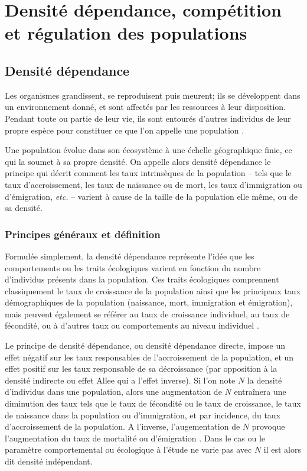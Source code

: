 \section{Densité dépendance,
compétition et régulation des populations}

\subsection{Densité dépendance}

Les organismes grandissent, se reproduisent puis meurent; ils se développent
dans un environnement donné, et sont affectés par les ressources à leur
disposition. Pendant toute ou partie de leur vie, ils sont
entourés d'autres individus de leur propre espèce pour constituer ce que l'on
appelle une population \autocites{begon2009a}. 

Une population évolue dans son écosystème à une échelle géographique finie, ce
qui la soumet à sa propre densité. On appelle alors densité
dépendance le principe qui décrit comment les taux intrinsèques de la
population -- tels que le taux d'accroissement, les taux de naissance ou de
mort, les taux d'immigration ou d'émigration, \textit{etc.} -- varient à cause
de la taille de la population elle même, ou de sa densité.

\subsubsection{Principes généraux et définition}

Formulée simplement, la densité dépendance représente l'idée que les
comportements ou les traits écologiques varient en fonction du nombre
d'individus présents dans la population. Ces traits écologiques comprennent
classiquement le taux de croissance de la population ainsi que les principaux
taux démographiques de la population (naissance, mort, immigration et
émigration), mais peuvent également se référer au taux de croissance individuel,
au taux de fécondité, ou à d'autres taux ou comportements au niveau individuel
\autocites{royama1977a}.

Le principe de densité dépendance, ou densité dépendance directe, impose un
effet négatif sur les taux responsables de l'accroissement de la population, et
un effet positif sur les taux responsable de sa décroissance (par opposition à
la densité indirecte ou effet Allee qui a l'effet inverse). Si l'on note $N$ la
densité d'individus dans une population, alors une augmentation de $N$
entraînera une diminution des taux tels que le taux de fécondité ou le taux de
croissance, le taux de naissance dans la population ou d'immigration, et par
incidence, du taux d'accroissement de la population. A l'inverse,
l'augementation de $N$ provoque l'augmentation du taux de mortalité ou
d'émigration \autocites{hixon2009a}. Dans le cas ou le paramètre comportemental
ou écologique à l'étude ne varie pas avec $N$ il est alors dit densité
indépendant.

